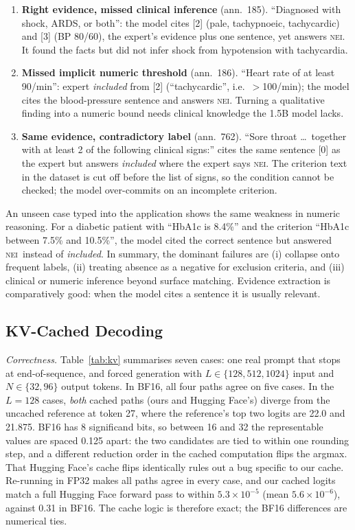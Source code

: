\documentclass[conference]{IEEEtran}
\newcommand{\NEI}{\textsc{nei}}
\begin{document}
\begin{enumerate}
\item \textbf{Right evidence, missed clinical inference} (ann.\ 185). ``Diagnosed with shock, ARDS, or both'': the model cites [2] (pale, tachypnoeic, tachycardic) and [3] (BP 80/60), the expert's evidence plus one sentence, yet answers \NEI. It found the facts but did not infer shock from hypotension with tachycardia.
\item \textbf{Missed implicit numeric threshold} (ann.\ 186). ``Heart rate of at least 90/min'': expert \emph{included} from [2] (``tachycardic'', i.e.\ $>$100/min); the model cites the blood-pressure sentence and answers \NEI. Turning a qualitative finding into a numeric bound needs clinical knowledge the 1.5B model lacks.
\item \textbf{Same evidence, contradictory label} (ann.\ 762). ``Sore throat \ldots\ together with at least 2 of the following clinical signs:'' cites the same sentence [0] as the expert but answers \emph{included} where the expert says \NEI. The criterion text in the dataset is cut off before the list of signs, so the condition cannot be checked; the model over-commits on an incomplete criterion.
\end{enumerate}

An unseen case typed into the application shows the same weakness in numeric reasoning. For a diabetic patient with ``HbA1c is 8.4\%'' and the criterion ``HbA1c between 7.5\% and 10.5\%'', the model cited the correct sentence but answered \NEI\ instead of \emph{included}. In summary, the dominant failures are (i) collapse onto frequent labels, (ii) treating absence as a negative for exclusion criteria, and (iii) clinical or numeric inference beyond surface matching. Evidence extraction is comparatively good: when the model cites a sentence it is usually relevant.

\subsection{KV-Cached Decoding}
\textit{Correctness.} Table~\ref{tab:kv} summarises seven cases: one real prompt that stops at end-of-sequence, and forced generation with $L\in\{128,512,1024\}$ input and $N\in\{32,96\}$ output tokens. In BF16, all four paths agree on five cases. In the $L{=}128$ cases, \emph{both} cached paths (ours and Hugging Face's) diverge from the uncached reference at token 27, where the reference's top two logits are 22.0 and 21.875. BF16 has 8 significand bits, so between 16 and 32 the representable values are spaced 0.125 apart: the two candidates are tied to within one rounding step, and a different reduction order in the cached computation flips the argmax. That Hugging Face's cache flips identically rules out a bug specific to our cache. Re-running in FP32 makes all paths agree in every case, and our cached logits match a full Hugging Face forward pass to within $5.3\times10^{-5}$ (mean $5.6\times10^{-6}$), against 0.31 in BF16. The cache logic is therefore exact; the BF16 differences are numerical ties.
\end{document}
